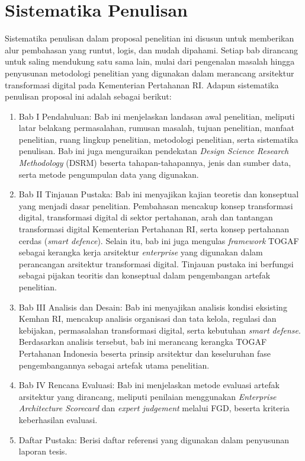\section{Sistematika Penulisan}
Sistematika penulisan dalam proposal penelitian ini disusun untuk memberikan alur pembahasan yang runtut, logis, dan mudah dipahami.
Setiap bab dirancang untuk saling mendukung satu sama lain, mulai dari pengenalan masalah hingga penyusunan metodologi penelitian yang digunakan dalam merancang arsitektur transformasi digital pada Kementerian Pertahanan RI.
Adapun sistematika penulisan proposal ini adalah sebagai berikut:
\begin{enumerate}
\item	Bab I Pendahuluan: Bab ini menjelaskan landasan awal penelitian, meliputi latar belakang permasalahan, rumusan masalah, tujuan penelitian, manfaat penelitian, ruang lingkup penelitian, metodologi penelitian, serta sistematika penulisan.
Bab ini juga menguraikan pendekatan \textit{Design Science Research Methodology} (DSRM) beserta tahapan-tahapannya, jenis dan sumber data, serta metode pengumpulan data yang digunakan.
\item	Bab II Tinjauan Pustaka: Bab ini menyajikan kajian teoretis dan konseptual yang menjadi dasar penelitian.
Pembahasan mencakup konsep transformasi digital, transformasi digital di sektor pertahanan, arah dan tantangan transformasi digital Kementerian Pertahanan RI,
serta konsep pertahanan cerdas (\textit{smart defence}). Selain itu, bab ini juga mengulas \textit{framework} TOGAF sebagai kerangka kerja arsitektur \textit{enterprise} yang digunakan dalam perancangan arsitektur transformasi digital.
Tinjauan pustaka ini berfungsi sebagai pijakan teoritis dan konseptual dalam pengembangan artefak penelitian.
\item	Bab III Analisis dan Desain: Bab ini menyajikan analisis kondisi eksisting Kemhan RI, mencakup analisis organisasi dan tata kelola, regulasi dan kebijakan, permasalahan transformasi digital, serta kebutuhan \textit{smart defense}.
Berdasarkan analisis tersebut, bab ini merancang kerangka TOGAF Pertahanan Indonesia beserta prinsip arsitektur dan keseluruhan fase pengembangannya sebagai artefak utama penelitian.
\item	Bab IV Rencana Evaluasi: Bab ini menjelaskan metode evaluasi artefak arsitektur yang dirancang, meliputi penilaian menggunakan \textit{Enterprise Architecture Scorecard}\texttrademark{} dan \textit{expert judgement} melalui FGD, beserta kriteria keberhasilan evaluasi.
\item   Daftar Pustaka: Berisi daftar referensi yang digunakan dalam penyusunan laporan tesis.
\end{enumerate}